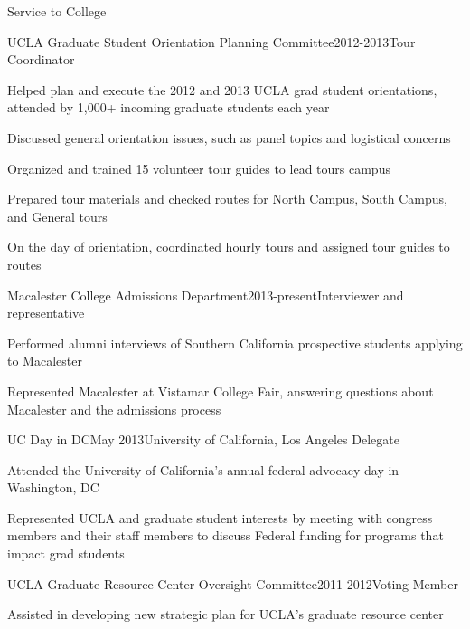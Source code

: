 \documentclass{resume} %
\begin{document}
\begin{rSection}{Service to College}

\begin{rSubsection}{UCLA Graduate Student Orientation Planning Committee}{}{2012-2013}{Tour Coordinator}
\item Helped plan and execute the 2012 and 2013 UCLA grad student orientations, attended by 1,000+ incoming graduate students each year
\item Discussed general orientation issues, such as panel topics and logistical concerns
\item Organized and trained 15 volunteer tour guides to lead tours campus
\item Prepared tour materials  and checked routes for North Campus, South Campus, and General tours
\item On the day of orientation, coordinated hourly tours and assigned tour guides to routes
\end{rSubsection}

\begin{rSubsection}{Macalester College Admissions Department}{}{2013-present}{Interviewer and representative}
\item Performed alumni interviews of Southern California prospective students applying to Macalester
\item Represented Macalester at Vistamar College Fair, answering questions about Macalester and the admissions process
\end{rSubsection}

\begin{rSubsection}{UC Day in DC}{}{May 2013}{University of California, Los Angeles Delegate}
\item Attended the University of California's annual federal advocacy day in Washington, DC
\item Represented UCLA and graduate student interests  by meeting with congress members and their staff members to discuss Federal funding for programs that impact grad students
\end{rSubsection}

\begin{rSubsection}{UCLA Graduate Resource Center Oversight Committee}{}{2011-2012}{Voting Member}
\item Assisted in developing new strategic plan for UCLA's graduate resource center
\end{rSubsection}

\end{rSection}
\end{document}
